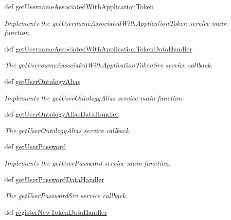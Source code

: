 \begin{DoxyCompactItemize}
def \hyperlink{classmysql__wrapper_1_1MySQLdbWrapper_abb09fc5020ab6a0c4e8418686aca3f2b}{get\-Username\-Associated\-With\-Application\-Token}
\begin{DoxyCompactList}\small\item\em Implements the get\-Username\-Associated\-With\-Application\-Token service main function. \end{DoxyCompactList}\item 
def \hyperlink{classmysql__wrapper_1_1MySQLdbWrapper_a7adfed03d9273651385825dd48f116ef}{get\-Username\-Associated\-With\-Application\-Token\-Data\-Handler}
\begin{DoxyCompactList}\small\item\em The get\-Username\-Associated\-With\-Application\-Token\-Srv service callback. \end{DoxyCompactList}\item 
def \hyperlink{classmysql__wrapper_1_1MySQLdbWrapper_a342a02201b46ee15e52f142057282057}{get\-User\-Ontology\-Alias}
\begin{DoxyCompactList}\small\item\em Implements the get\-User\-Ontology\-Alias service main function. \end{DoxyCompactList}\item 
def \hyperlink{classmysql__wrapper_1_1MySQLdbWrapper_a6519bb5e92dbf1361b43782ccde0b05e}{get\-User\-Ontology\-Alias\-Data\-Handler}
\begin{DoxyCompactList}\small\item\em The get\-User\-Ontology\-Alias service callback. \end{DoxyCompactList}\item 
def \hyperlink{classmysql__wrapper_1_1MySQLdbWrapper_a12e0252f76ed6ff53d07a9d148fabc45}{get\-User\-Password}
\begin{DoxyCompactList}\small\item\em Implements the get\-User\-Password service main function. \end{DoxyCompactList}\item 
def \hyperlink{classmysql__wrapper_1_1MySQLdbWrapper_ad3ad44a49b141a20424312677609cb55}{get\-User\-Password\-Data\-Handler}
\begin{DoxyCompactList}\small\item\em The get\-User\-Password\-Srv service callback. \end{DoxyCompactList}\item 
def \hyperlink{classmysql__wrapper_1_1MySQLdbWrapper_a450bff6178797cd59a4d605e65fc640d}{register\-New\-Token\-Data\-Handler}

\end{DoxyCompactItemize}
